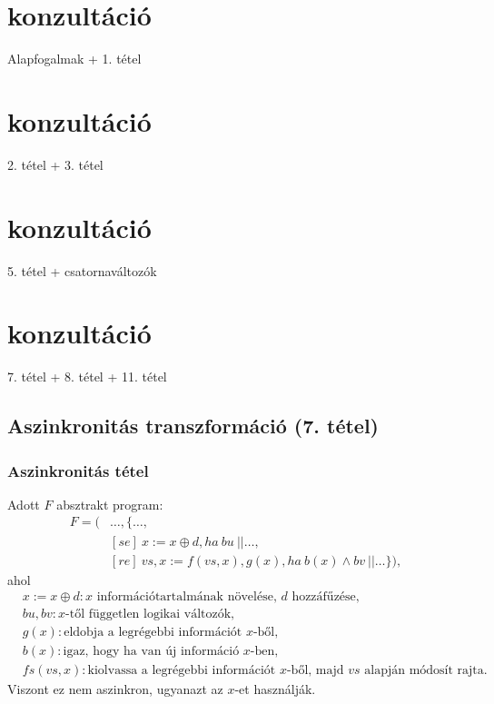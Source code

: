 \documentclass[12pt]{article}
\begin{document}
	
	\newpage
	\section{konzultáció}
	Alapfogalmak + 1. tétel
	
	\newpage
	\section{konzultáció}
	2. tétel + 3. tétel
	
	\newpage
	\section{konzultáció}
	5. tétel + csatornaváltozók
	
	\newpage
	\section{konzultáció}
	7. tétel + 8. tétel + 11. tétel
	
	\subsection{Aszinkronitás transzformáció (7. tétel)}
	
	\subsubsection{Aszinkronitás tétel}
	Adott $F$ absztrakt program: 
	\begin{align*}
	F = ( &\dots, \{ \dots, \\
		&[se]\ x := x \oplus d, ha\ bu\ || \dots, \\
		&[re]\ vs, x := f(vs, x), g(x), ha\ b(x) \land bv\ || \dots\}),
	\end{align*}
	ahol
	\begin{align*}
	&x := x \oplus d: \text{$x$ információtartalmának növelése, $d$ hozzáfűzése}, \\
	&bu, bv: \text{$x$-től független logikai változók}, \\
	&g(x): \text{eldobja a legrégebbi információt $x$-ből}, \\
	&b(x): \text{igaz, hogy ha van új információ $x$-ben}, \\
	&fs(vs, x): \text{kiolvassa a legrégebbi információt $x$-ből, majd $vs$ alapján módosít rajta}.
	\end{align*}
	Viszont ez nem aszinkron, ugyanazt az $x$-et használják.
	
\end{document}
